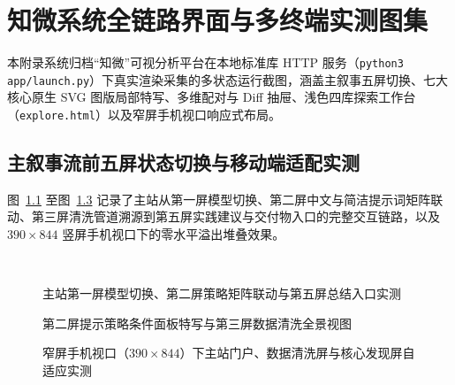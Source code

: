 \chapter{知微系统全链路界面与多终端实测图集}\label{app:evidence}

本附录系统归档“知微”可视分析平台在本地标准库 HTTP 服务（\texttt{python3 app/launch.py}）下真实渲染采集的多状态运行截图，涵盖主叙事五屏切换、七大核心原生 SVG 图版局部特写、多维配对与 Diff 抽屉、浅色四库探索工作台（\texttt{explore.html}）以及窄屏手机视口响应式布局。

\section{主叙事流前五屏状态切换与移动端适配实测}

图~\ref{fig:app-e-s1s5} 至图~\ref{fig:app-e-mobile-trio} 记录了主站从第一屏模型切换、第二屏中文与简洁提示词矩阵联动、第三屏清洗管道溯源到第五屏实践建议与交付物入口的完整交互链路，以及 $390\times 844$ 竖屏手机视口下的零水平溢出堆叠效果。

\begin{figure}[!htbp]
\centering
{}\hfill
{}\\[6pt]
\hfill
{}
\caption{主站第一屏模型切换、第二屏策略矩阵联动与第五屏总结入口实测}
\label{fig:app-e-s1s5}
\end{figure}

\begin{figure}[!htbp]
\centering
{}\hfill
{}
\caption{第二屏提示策略条件面板特写与第三屏数据清洗全景视图}
\label{fig:app-e-s2s3}
\end{figure}

\begin{figure}[!htbp]
\centering
{}\hfill
{}\hfill
{}
\caption{窄屏手机视口（$390\times 844$）下主站门户、数据清洗屏与核心发现屏自适应实测}
\label{fig:app-e-mobile-trio}
\end{figure}


